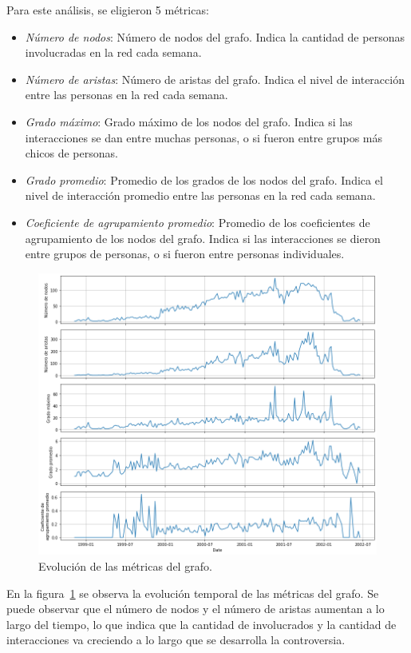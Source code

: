 \documentclass{article}
\begin{document}
Para este análisis, se eligieron 5 métricas:
\begin{itemize}
    \item \emph{Número de nodos}: Número de nodos del grafo. Indica la cantidad de personas involucradas en la red cada semana.
    \item \emph{Número de aristas}: Número de aristas del grafo. Indica el nivel de interacción entre las personas en la red cada semana.
    \item \emph{Grado máximo}: Grado máximo de los nodos del grafo. Indica si las interacciones se dan entre muchas personas, o si fueron entre grupos más chicos de personas.
    \item \emph{Grado promedio}: Promedio de los grados de los nodos del grafo. Indica el nivel de interacción promedio entre las personas en la red cada semana.
    \item \emph{Coeficiente de agrupamiento promedio}: Promedio de los coeficientes de agrupamiento de los nodos del grafo. Indica si las interacciones se dieron entre grupos de personas, o si fueron entre personas individuales.
\end{itemize}

\begin{figure}[htb]
    \centering
    \includegraphics[width=\linewidth]{imagenes/ej1/metricas_grafo.png}
    \caption{Evolución de las métricas del grafo.}
    \label{fig:metricas_grafo}
\end{figure}

En la figura~\ref{fig:metricas_grafo} se observa la evolución temporal de las métricas del grafo. Se puede observar que el número de nodos y el número de aristas aumentan a lo largo del tiempo, lo que indica que la cantidad de involucrados y la cantidad de interacciones va creciendo a lo largo que se desarrolla la controversia.
\end{document}
